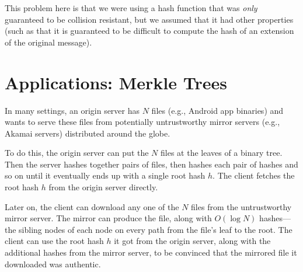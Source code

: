 This problem here is that we were using a hash
function that was \emph{only} guaranteed to be
collision resistant, but we assumed that it had other
properties (such as that it is guaranteed to be
difficult to compute the hash of an extension of
the original message).

\section{Applications: Merkle Trees}
In many settings, an origin server has $N$ files (e.g., Android app binaries)
and wants to serve these files from potentially untrustworthy mirror servers
(e.g., Akamai servers) distributed around the globe.

To do this, the origin server can put the $N$ files at the leaves of a
binary tree.
Then the server hashes together pairs of files, then hashes each pair of
hashes and so on until it eventually ends up with
a single root hash $h$.
The client fetches the root hash $h$ from the origin
server directly.

Later on, the client can download any one of the $N$
files from the untrustworthy mirror server.
The mirror can produce the file, along
with $O(\log N)$ hashes---the sibling
nodes of each node on every path from the file's
leaf to the root.
The client can use the root hash $h$ it got from
the origin server, along with the additional hashes
from the mirror server, to be convinced that the mirrored
file it downloaded was authentic.


